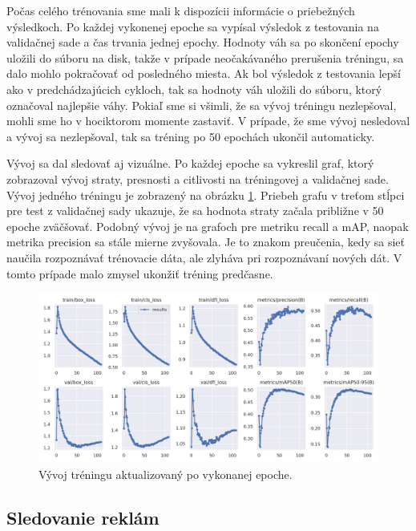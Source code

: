 Počas celého trénovania sme mali k dispozícii informácie o priebežných výsledkoch. Po každej vykonenej epoche sa vypísal výsledok z testovania na validačnej sade a čas trvania jednej epochy. Hodnoty váh sa po skončení epochy uložili do súboru na disk, takže v prípade neočakávaného prerušenia tréningu, sa dalo mohlo pokračovať od posledného miesta. Ak bol výsledok z testovania lepší ako v predchádzajúcich cykloch, tak sa hodnoty váh uložili do súboru, ktorý označoval najlepšie váhy. Pokiaľ sme si všimli, že sa vývoj tréningu nezlepšoval, mohli sme ho v hociktorom momente zastaviť. V prípade, že sme vývoj nesledoval a vývoj sa nezlepšoval, tak sa tréning po 50 epochách ukončil automaticky.

Vývoj sa dal sledovať aj vizuálne. Po každej epoche sa vykreslil graf, ktorý zobrazoval vývoj straty, presnosti a citlivosti na tréningovej a validačnej sade. Vývoj jedného tréningu je zobrazený na obrázku \ref{img:graf}. Priebeh grafu v treťom stĺpci pre test z validačnej sady ukazuje, že sa hodnota straty začala približne v 50 epoche zväčšovať. Podobný vývoj je na grafoch pre metriku recall a mAP, naopak metrika precision sa stále mierne zvyšovala. Je to znakom preučenia, kedy sa sieť naučila rozpoznávať trénovacie dáta, ale zlyháva pri rozpoznávaní nových dát. V tomto prípade malo zmysel ukonžiť tréning predčasne.
\\
\begin{figure}[ht]
    \centering
    \includegraphics[width=1\textwidth]{images/04/graf.png}
    \caption{Vývoj tréningu aktualizovaný po vykonanej epoche.}
    \label{img:graf}
\end{figure}

\subsection{Sledovanie reklám}

